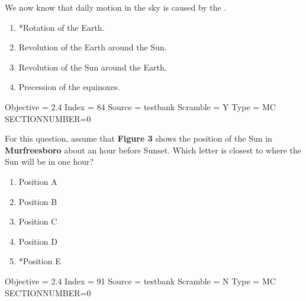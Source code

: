 \documentclass[11pt]{article}
\begin{document}
\begin{enumerate}
\begin{minipage}{\textwidth}
\begin{minipage}{\textwidth}
\item We now know that daily motion in the sky is caused by the \underline{\hspace{0.5in}}.
\begin{multicols}{2}
\begin{enumerate} 
\setlength{\itemsep}{1pt} 
\setlength{\parskip}{0pt} 
\setlength{\parsep}{0pt}
\setlength{\multicolsep}{1pt} 
\item *Rotation of the Earth.
\item Revolution of the Earth around the Sun.
\item Revolution of the Sun around the Earth.
\item Precession of the equinoxes.
\end{enumerate} 
\vfill 
\end{multicols}

Objective = 2.4
Index = 84
Source = testbank
Scramble = Y
Type = MC
SECTIONNUMBER=0
\end{minipage}
\end{minipage}
\vskip 0.20in

\begin{minipage}{\textwidth}
\begin{minipage}{\textwidth}
\item For this question, assume that {\bf Figure 3} shows the position of the Sun in {\bf Murfreesboro} about an hour before Sunset.   Which letter is closest to where the Sun will be in one hour?
\begin{multicols}{3}
\begin{enumerate} 
\setlength{\itemsep}{1pt} 
\setlength{\parskip}{0pt} 
\setlength{\parsep}{0pt}
\setlength{\multicolsep}{1pt} 
\item Position A
\item Position B
\item Position C
\item Position D
\item *Position E
\end{enumerate} 
\vfill 
\end{multicols}

Objective = 2.4
Index = 91
Source = testbank
Scramble = N
Type = MC
SECTIONNUMBER=0
\end{minipage}
\end{minipage}
\vskip 0.20in


\end{enumerate}
\end{document}
